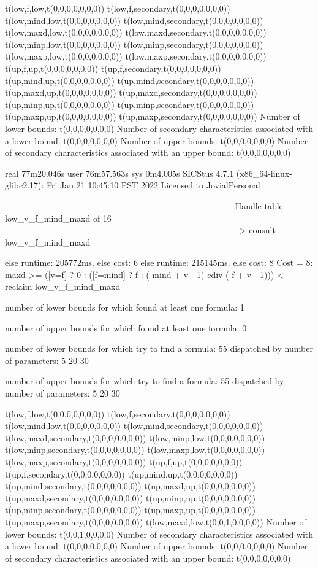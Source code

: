 t(low,f,low,t(0,0,0,0,0,0,0))
t(low,f,secondary,t(0,0,0,0,0,0,0))
t(low,mind,low,t(0,0,0,0,0,0,0))
t(low,mind,secondary,t(0,0,0,0,0,0,0))
t(low,maxd,low,t(0,0,0,0,0,0,0))
t(low,maxd,secondary,t(0,0,0,0,0,0,0))
t(low,minp,low,t(0,0,0,0,0,0,0))
t(low,minp,secondary,t(0,0,0,0,0,0,0))
t(low,maxp,low,t(0,0,0,0,0,0,0))
t(low,maxp,secondary,t(0,0,0,0,0,0,0))
t(up,f,up,t(0,0,0,0,0,0,0))
t(up,f,secondary,t(0,0,0,0,0,0,0))
t(up,mind,up,t(0,0,0,0,0,0,0))
t(up,mind,secondary,t(0,0,0,0,0,0,0))
t(up,maxd,up,t(0,0,0,0,0,0,0))
t(up,maxd,secondary,t(0,0,0,0,0,0,0))
t(up,minp,up,t(0,0,0,0,0,0,0))
t(up,minp,secondary,t(0,0,0,0,0,0,0))
t(up,maxp,up,t(0,0,0,0,0,0,0))
t(up,maxp,secondary,t(0,0,0,0,0,0,0))
Number of lower bounds:                                             t(0,0,0,0,0,0,0)
Number of secondary characteristics associated with a lower bound:  t(0,0,0,0,0,0,0)
Number of upper bounds:                                             t(0,0,0,0,0,0,0)
Number of secondary characteristics associated with an upper bound: t(0,0,0,0,0,0,0)

real	77m20.046s
user	76m57.563s
sys	0m4.005s
SICStus 4.7.1 (x86_64-linux-glibc2.17): Fri Jan 21 10:45:10 PST 2022
Licensed to JovialPersonal


--------------------------------------------------------------------------------
Handle table low_v_f_mind_maxd of 16
--------------------------------------------------------------------------------
--> consult low_v_f_mind_maxd

else runtime: 205772ms. else cost: 6
else runtime: 215145ms. else cost: 8
Cost =  8:  maxd >= ([v=f] ? 0 : ([f=mind] ? f : (-mind + v - 1) cdiv (-f + v - 1))) %
<-- reclaim low_v_f_mind_maxd

number of lower bounds for which found at least one formula: 1

number of upper bounds for which found at least one formula: 0

number of lower bounds for which try to find a formula: 55
dispatched by number of parameters: 5  20  30

number of upper bounds for which try to find a formula: 55
dispatched by number of parameters: 5  20  30

t(low,f,low,t(0,0,0,0,0,0,0))
t(low,f,secondary,t(0,0,0,0,0,0,0))
t(low,mind,low,t(0,0,0,0,0,0,0))
t(low,mind,secondary,t(0,0,0,0,0,0,0))
t(low,maxd,secondary,t(0,0,0,0,0,0,0))
t(low,minp,low,t(0,0,0,0,0,0,0))
t(low,minp,secondary,t(0,0,0,0,0,0,0))
t(low,maxp,low,t(0,0,0,0,0,0,0))
t(low,maxp,secondary,t(0,0,0,0,0,0,0))
t(up,f,up,t(0,0,0,0,0,0,0))
t(up,f,secondary,t(0,0,0,0,0,0,0))
t(up,mind,up,t(0,0,0,0,0,0,0))
t(up,mind,secondary,t(0,0,0,0,0,0,0))
t(up,maxd,up,t(0,0,0,0,0,0,0))
t(up,maxd,secondary,t(0,0,0,0,0,0,0))
t(up,minp,up,t(0,0,0,0,0,0,0))
t(up,minp,secondary,t(0,0,0,0,0,0,0))
t(up,maxp,up,t(0,0,0,0,0,0,0))
t(up,maxp,secondary,t(0,0,0,0,0,0,0))
t(low,maxd,low,t(0,0,1,0,0,0,0))
Number of lower bounds:                                             t(0,0,1,0,0,0,0)
Number of secondary characteristics associated with a lower bound:  t(0,0,0,0,0,0,0)
Number of upper bounds:                                             t(0,0,0,0,0,0,0)
Number of secondary characteristics associated with an upper bound: t(0,0,0,0,0,0,0)

